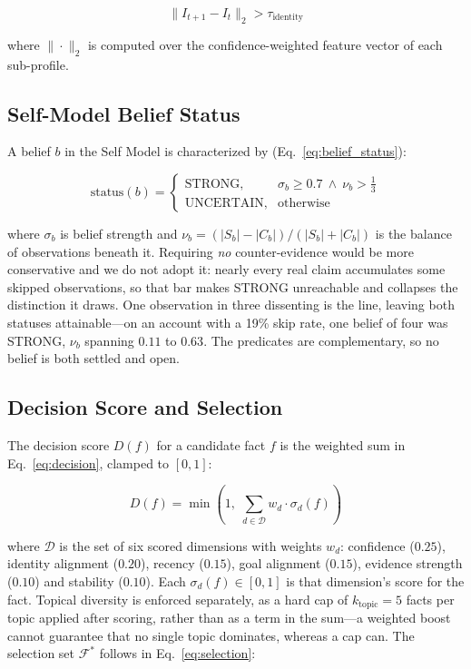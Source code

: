 \documentclass[conference]{IEEEtran}
\begin{document}
\begin{equation}
\|I_{t+1} - I_t\|_2 > \tau_{\text{identity}}
\label{eq:snapshot_condition}
\end{equation}

where $\|\cdot\|_2$ is computed over the confidence-weighted feature vector of each sub-profile.

\subsection{Self-Model Belief Status}
A belief $b$ in the Self Model is characterized by (Eq.~\eqref{eq:belief_status}):

\begin{equation}
\text{status}(b) =
\begin{cases}
\text{STRONG}, & \sigma_b \geq 0.7 \ \land\ \nu_b > \tfrac{1}{3} \\
\text{UNCERTAIN}, & \text{otherwise}
\end{cases}
\label{eq:belief_status}
\end{equation}

where $\sigma_b$ is belief strength and $\nu_b = (|S_b| - |C_b|)/(|S_b| + |C_b|)$ is the balance of observations beneath it. Requiring \emph{no} counter-evidence would be more conservative and we do not adopt it: nearly every real claim accumulates some skipped observations, so that bar makes STRONG unreachable and collapses the distinction it draws. One observation in three dissenting is the line, leaving both statuses attainable---on an account with a 19\% skip rate, one belief of four was STRONG, $\nu_b$ spanning $0.11$ to $0.63$. The predicates are complementary, so no belief is both settled and open.

\subsection{Decision Score and Selection}
The decision score $D(f)$ for a candidate fact $f$ is the weighted sum in Eq.~\eqref{eq:decision}, clamped to $[0,1]$:

\begin{equation}
D(f) = \min\!\left(1,\; \sum_{d \in \mathcal{D}} w_d \cdot \sigma_d(f)\right)
\label{eq:decision}
\end{equation}

where $\mathcal{D}$ is the set of six scored dimensions with weights $w_d$: confidence ($0.25$), identity alignment ($0.20$), recency ($0.15$), goal alignment ($0.15$), evidence strength ($0.10$) and stability ($0.10$). Each $\sigma_d(f) \in [0,1]$ is that dimension's score for the fact. Topical diversity is enforced separately, as a hard cap of $k_{\text{topic}} = 5$ facts per topic applied after scoring, rather than as a term in the sum---a weighted boost cannot guarantee that no single topic dominates, whereas a cap can. The selection set $\mathcal{F}^*$ follows in Eq.~\eqref{eq:selection}:
\end{document}
